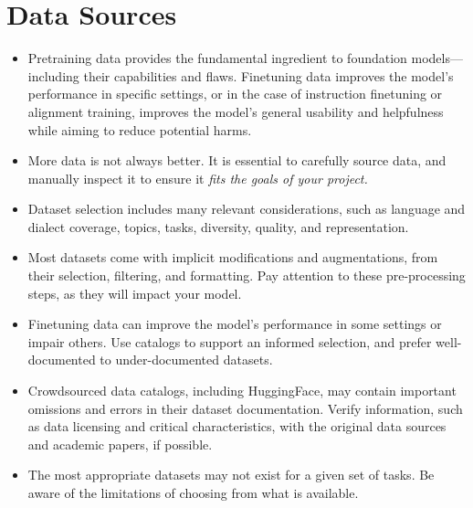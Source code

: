 \section{Data Sources}
\label{sec:data}
\vspace{-2mm}


\begin{tcolorbox}[
    width=\textwidth,
    title={Data Sourcing Best Practices},
    colback=backgroundcol, %
    colframe=darkgray, %
    colbacktitle=dataprep, %
    coltitle=white, %
    coltext=black %
]

\begin{itemize}[itemsep=0pt, wide=3pt]
    \item Pretraining data provides the fundamental ingredient to foundation models---including their capabilities and flaws. Finetuning data improves the model's performance in specific settings, or in the case of instruction finetuning or alignment training, improves the model's general usability and helpfulness while aiming to reduce potential harms.
    \item More data is not always better. It is essential to carefully source data, and manually inspect it to ensure it \emph{fits the goals of your project.}
    \item Dataset selection includes many relevant considerations, such as language and dialect coverage, topics, tasks, diversity, quality, and representation.
    \item Most datasets come with implicit modifications and augmentations, from their selection, filtering, and formatting. Pay attention to these pre-processing steps, as they will impact your model.
    \item Finetuning data can improve the model's performance in some settings or impair others. Use catalogs to support an informed selection, and prefer well-documented to under-documented datasets.
    \item Crowdsourced data catalogs, including HuggingFace, may contain important omissions and errors in their dataset documentation. Verify information, such as data licensing and critical characteristics, with the original data sources and academic papers, if possible.
    \item The most appropriate datasets may not exist for a given set of tasks. Be aware of the limitations of choosing from what is available. 
\end{itemize}
\end{tcolorbox}

